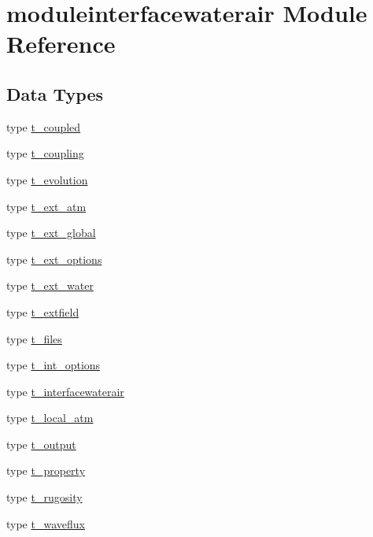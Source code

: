 \hypertarget{namespacemoduleinterfacewaterair}{}\section{moduleinterfacewaterair Module Reference}
\label{namespacemoduleinterfacewaterair}
\subsection*{Data Types}
\begin{DoxyCompactItemize}
\item 
type \mbox{\hyperlink{structmoduleinterfacewaterair_1_1t__coupled}{t\+\_\+coupled}}
\item 
type \mbox{\hyperlink{structmoduleinterfacewaterair_1_1t__coupling}{t\+\_\+coupling}}
\item 
type \mbox{\hyperlink{structmoduleinterfacewaterair_1_1t__evolution}{t\+\_\+evolution}}
\item 
type \mbox{\hyperlink{structmoduleinterfacewaterair_1_1t__ext__atm}{t\+\_\+ext\+\_\+atm}}
\item 
type \mbox{\hyperlink{structmoduleinterfacewaterair_1_1t__ext__global}{t\+\_\+ext\+\_\+global}}
\item 
type \mbox{\hyperlink{structmoduleinterfacewaterair_1_1t__ext__options}{t\+\_\+ext\+\_\+options}}
\item 
type \mbox{\hyperlink{structmoduleinterfacewaterair_1_1t__ext__water}{t\+\_\+ext\+\_\+water}}
\item 
type \mbox{\hyperlink{structmoduleinterfacewaterair_1_1t__extfield}{t\+\_\+extfield}}
\item 
type \mbox{\hyperlink{structmoduleinterfacewaterair_1_1t__files}{t\+\_\+files}}
\item 
type \mbox{\hyperlink{structmoduleinterfacewaterair_1_1t__int__options}{t\+\_\+int\+\_\+options}}
\item 
type \mbox{\hyperlink{structmoduleinterfacewaterair_1_1t__interfacewaterair}{t\+\_\+interfacewaterair}}
\item 
type \mbox{\hyperlink{structmoduleinterfacewaterair_1_1t__local__atm}{t\+\_\+local\+\_\+atm}}
\item 
type \mbox{\hyperlink{structmoduleinterfacewaterair_1_1t__output}{t\+\_\+output}}
\item 
type \mbox{\hyperlink{structmoduleinterfacewaterair_1_1t__property}{t\+\_\+property}}
\item 
type \mbox{\hyperlink{structmoduleinterfacewaterair_1_1t__rugosity}{t\+\_\+rugosity}}
\item 
type \mbox{\hyperlink{structmoduleinterfacewaterair_1_1t__waveflux}{t\+\_\+waveflux}}
\end{DoxyCompactItemize}
